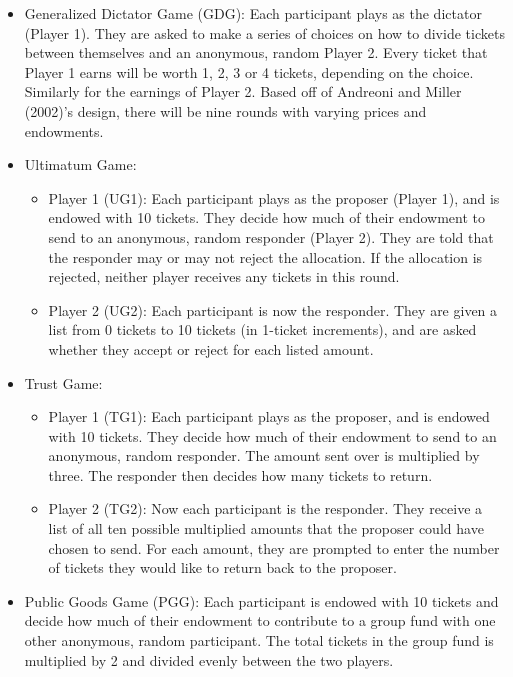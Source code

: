 \documentclass[12pt]{article}
\begin{document}
\begin{itemize}

\item{Generalized Dictator Game (GDG)}:  Each participant plays as the dictator (Player 1). They are asked to make a series of choices on how to divide tickets between themselves and an anonymous, random Player 2. Every ticket that Player 1 earns will be worth 1, 2, 3 or 4 tickets, depending on the choice. Similarly for the earnings of Player 2. Based off of Andreoni and Miller (2002)'s design, there will be nine rounds with varying prices and endowments.
\item{Ultimatum Game}: 
	\begin{itemize}
		\item{Player 1 (UG1)}: Each participant plays as the proposer (Player 1), and is endowed with 10 tickets. They decide how much of their endowment to send to an anonymous, random responder (Player 2). They are told that the responder may or may not reject the allocation. If the allocation is rejected, neither player receives any tickets in this round.
		\item{Player 2 (UG2)}: Each participant is now the responder. They are given a list from 0 tickets to 10 tickets (in 1-ticket increments), and are asked whether they accept or reject for each listed amount.
	\end{itemize}
\item{Trust Game}:
	\begin{itemize}
		\item{Player 1 (TG1)}: Each participant plays as the proposer, and is endowed with 10 tickets. They decide how much of their endowment to send to an anonymous, random responder. The amount sent over is multiplied by three. The responder then decides how many tickets to return. 
		\item{Player 2 (TG2)}: Now each participant is the responder. They receive a list of all ten possible multiplied amounts that the proposer could have chosen to send. For each amount, they are prompted to enter the number of tickets they would like to return back to the proposer.
	\end{itemize}
\item{Public Goods Game (PGG)}: Each participant is endowed with 10 tickets and decide how much of their endowment to contribute to a group fund with one other anonymous, random participant. The total tickets in the group fund is multiplied by 2 and divided evenly between the two players.

\end{itemize}
\end{document}
